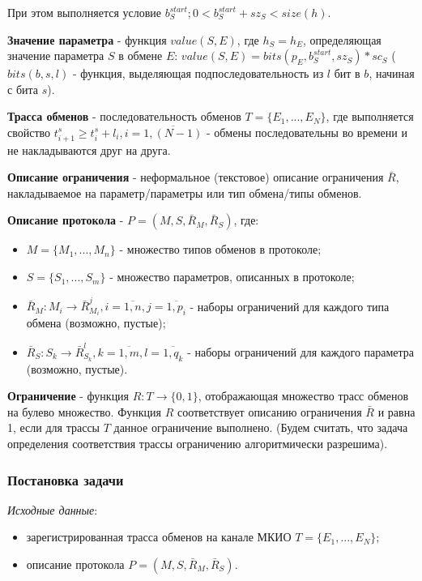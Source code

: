 При этом выполняется условие $b^{start}_S; 0 < b^{start}_S + sz_S < size(h)$.

\textbf{Значение параметра} - функция $value(S, E)$, где $h_S = h_E$, 
определяющая значение параметра $S$ в обмене $E$: $value(S, E) = bits(p_E, 
b^{start}_S, sz_S) * sc_S$ ($bits(b, s, l)$ - функция, выделяющая 
подпоследовательность из $l$ бит в $b$, начиная с бита $s$).

\textbf{Трасса обменов} - последовательность обменов $T = \{E_1, ..., E_N\}$, 
где выполняется свойство $t^s_{i+1} \geq t^s_{i} + l_{i}, i = 
\overline{1,(N-1)}$ - обмены последовательны во времени и не накладываются друг 
на друга.


\textbf{Описание ограничения} - неформальное (текстовое) описание ограничения 
$\bar{R}$, накладываемое на параметр/параметры или тип обмена/типы обменов.

\textbf{Описание протокола} - $P = (M, S, \bar{R}_M, \bar{R}_S)$, где:
 \begin{itemize}
  \item $M = \{M_1, ..., M_n\}$ - множество типов обменов в протоколе;
  \item $S = \{S_1, ..., S_m\}$ - множество параметров, описанных в протоколе;
  \item $\bar{R}_M: M_i \rightarrow \bar{R}_{M_i}^{j}, i = \overline{1,n}, j = 
\overline{1,p_i}$ - наборы ограничений для каждого типа
обмена (возможно, пустые);
  \item $\bar{R}_S: S_k \rightarrow \bar{R}_{S_k}^{l}, k = \overline{1,m}, l = 
\overline{1, 
q_k}$ - наборы ограничений для каждого параметра (возможно, пустые).
\end{itemize}

\textbf{Ограничение} - функция $R: T \rightarrow \{0, 1\}$, отображающая 
множество трасс обменов на булево множество. Функция $R$ соответствует описанию 
ограничения $\bar{R}$ и равна 1, если для трассы $T$ данное ограничение 
выполнено. (Будем считать, что задача определения соответствия трассы 
ограничению алгоритмически разрешима).
 
 
\subsubsection{Постановка задачи}

\textit{Исходные данные}: 

\begin{itemize}
 \item зарегистрированная трасса обменов на канале МКИО $T = \{E_1, ..., E_N\}$;
 \item описание протокола $P = (M, S, \bar{R}_M, \bar{R}_S)$.
\end{itemize}

